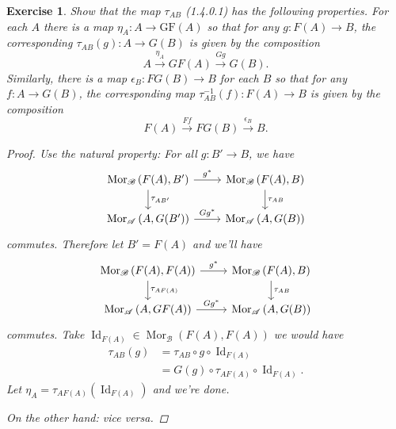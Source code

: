 \documentclass{article}
\theoremstyle{breakstyle}
\newtheorem{exercise}{Exercise}[section]
\DeclareMathOperator{\id}{Id}
\DeclareMathOperator{\mor}{Mor}
\begin{document}
\begin{exercise}
Show that the map $\tau_{AB}$ (1.4.0.1) has the following properties. For
each $A$ there is a map $\eta_{A}: A \to \mathrm{GF}(A)$ so that for any
$g: F(A) \to B$, the corresponding $\tau_{AB}(g): A \to G(B)$ is given by
the composition
$$
A \xrightarrow{\eta_{A}} GF(A) \xrightarrow{Gg} G(B).
$$
Similarly, there is a map $\epsilon_{B}\colon FG(B)\to B$ for each $B$ so
that for any $f\colon A\to G(B)$, the corresponding map
$\tau_{AB}^{-1}(f)\colon F(A)\to B$ is given by the composition
$$
F(A) \xrightarrow{Ff} FG(B) \xrightarrow{\epsilon_{B}} B.
$$

\begin{proof}
    Use the natural property: For all $g:B'\longrightarrow B$, we have
    $$
        \begin{tikzcd}
        {\mor_{\mathscr{B}}{(F(A),B')}} \arrow[r, "g^*"] \arrow[d, "\tau_{AB'}"] & {\mor_{\mathscr{B}}{(F(A),B)}} \arrow[d, "\tau_{AB}"] \\
        {\mor_{\mathscr{A}}{(A,G(B'))}} \arrow[r, "Gg^*"]                        & {\mor_{\mathscr{A}}{(A,G(B))}}                       
        \end{tikzcd}
    $$
    commutes. Therefore let $B'=F(A)$ and we'll have
    $$
        \begin{tikzcd}
        {\mor_{\mathscr{B}}{(F(A),F(A))}} \arrow[r, "g^*"] \arrow[d, "\tau_{AF(A)}"] & {\mor_{\mathscr{B}}{(F(A),B)}} \arrow[d, "\tau_{AB}"] \\
        {\mor_{\mathscr{A}}{(A,GF(A))}} \arrow[r, "Gg^*"]                            & {\mor_{\mathscr{A}}{(A,G(B))}}                       
        \end{tikzcd}
    $$
    commutes. Take $\id_{F(A)}\in \mor_{\mathscr{B}}(F(A),F(A))$ we would have
    \begin{align*}
        \tau_{AB}(g)
        &= \tau_{AB}\circ g\circ \id_{F(A)} \\
        &= G(g)\circ \tau_{AF(A)}\circ \id_{F(A)}
    .\end{align*}
    Let $\eta_{A}=\tau_{AF(A)}(\id_{F(A)})$ and we're done.

    On the other hand: vice versa.
\end{proof}

\end{exercise}
\end{document}
